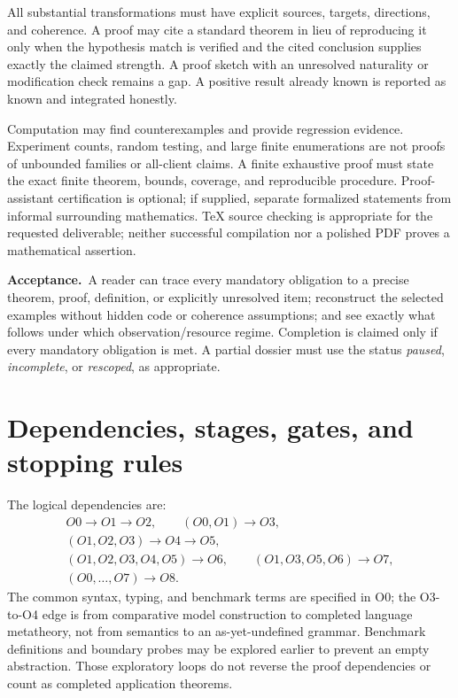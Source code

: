 \documentclass[11pt,a4paper]{article}
\newcommand{\accept}{\par\textbf{Acceptance.}\ }
\begin{document}
All substantial transformations must have explicit sources, targets,
directions, and coherence. A proof may cite a standard theorem in lieu of
reproducing it only when the hypothesis match is verified and the cited
conclusion supplies exactly the claimed strength. A proof sketch with an
unresolved naturality or modification check remains a gap. A positive result
already known is reported as known and integrated honestly.

Computation may find counterexamples and provide regression evidence.
Experiment counts, random testing, and large finite enumerations are not
proofs of unbounded families or all-client claims. A finite exhaustive proof
must state the exact finite theorem, bounds, coverage, and reproducible
procedure. Proof-assistant certification is optional; if supplied, separate
formalized statements from informal surrounding mathematics. TeX source
checking is appropriate for the requested deliverable; neither successful
compilation nor a polished PDF proves a mathematical assertion.

\accept A reader can trace every mandatory obligation to a precise theorem,
proof, definition, or explicitly unresolved item; reconstruct the selected
examples without hidden code or coherence assumptions; and see exactly
what follows under which observation/resource regime. Completion is claimed
only if every mandatory obligation is met. A partial dossier must use the
status \emph{paused}, \emph{incomplete}, or \emph{rescoped}, as appropriate.

\section{Dependencies, stages, gates, and stopping rules}\label{sec:gates}

The logical dependencies are:
\[
 \begin{gathered}
 O0\longrightarrow O1\longrightarrow O2,\qquad
 (O0,O1)\longrightarrow O3,\\
 (O1,O2,O3)\longrightarrow O4\longrightarrow O5,\\
 (O1,O2,O3,O4,O5)\longrightarrow O6,\qquad
 (O1,O3,O5,O6)\longrightarrow O7,\\
 (O0,\ldots,O7)\longrightarrow O8.
 \end{gathered}
\]
The common syntax, typing, and benchmark terms are specified in O0; the
O3-to-O4 edge is from comparative model construction to completed language
metatheory, not from semantics to an as-yet-undefined grammar.
Benchmark definitions and boundary probes may be explored earlier to prevent
an empty abstraction. Those exploratory loops do not reverse the proof
dependencies or count as completed application theorems.
\end{document}
